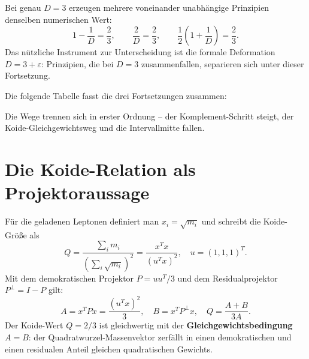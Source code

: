 Bei genau \(D = 3\) erzeugen mehrere voneinander unabhängige Prinzipien
denselben numerischen Wert:
\begin{equation}
  1 - \frac{1}{D} = \frac{2}{3}, \qquad
  \frac{2}{D} = \frac{2}{3}, \qquad
  \frac{1}{2}\!\left(1 + \frac{1}{D}\right) = \frac{2}{3}.
\end{equation}
Das nützliche Instrument zur Unterscheidung ist die formale Deformation
\(D = 3+\varepsilon\): Prinzipien, die bei \(D = 3\) zusammenfallen,
separieren sich unter dieser Fortsetzung.

Die folgende Tabelle fasst die drei Fortsetzungen zusammen:

\begin{center}
\renewcommand{\arraystretch}{1.5}
\end{center}

Die Wege trennen sich in erster Ordnung -- der Komplement-Schritt steigt,
der Koide-Gleichgewichtsweg und die Intervallmitte fallen.

\section{Die Koide-Relation als Projektoraussage}

Für die geladenen Leptonen definiert man \(x_i = \sqrt{m_i}\) und schreibt
die Koide-Größe als
\begin{equation}
  Q = \frac{\sum_i m_i}{\left(\sum_i \sqrt{m_i}\right)^2}
    = \frac{x^Tx}{(u^Tx)^2},
  \quad u = (1,1,1)^T.
\end{equation}
Mit dem demokratischen Projektor \(P = uu^T/3\) und dem Residualprojektor
\(P^\perp = I - P\) gilt:
\[
  A = x^TPx = \frac{(u^Tx)^2}{3}, \quad B = x^TP^\perp x,
  \quad Q = \frac{A+B}{3A}.
\]
Der Koide-Wert \(Q = 2/3\) ist gleichwertig mit der
\textbf{Gleichgewichtsbedingung} \(A = B\):
der Quadratwurzel-Massenvektor zerfällt in einen demokratischen
und einen residualen Anteil gleichen quadratischen Gewichts.

